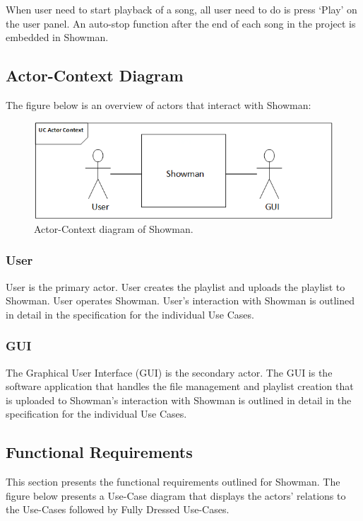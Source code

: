When user need to start playback of a song, all user need to do is press `Play' on the user panel. An auto-stop function after the end of each song in the project is embedded in Showman. \newline

\subsection{Actor-Context Diagram}

The figure below is an overview of actors that interact with Showman:

\begin{figure}[htb!]
\centering
\includegraphics[scale=1]{./pictures/ActorContext.png}
\caption{Actor-Context diagram of Showman.}
\label{fig:ActorContext.png}
\end{figure}

\subsubsection{User}
User is the primary actor. User creates the playlist and uploads the playlist to Showman. User operates Showman. User's interaction with Showman is outlined in detail in the specification for the individual Use Cases. \newline

\subsubsection{GUI}
The Graphical User Interface (GUI) is the secondary actor. The GUI is the software application that handles the file management and playlist creation that is uploaded to Showman's interaction with Showman is outlined in detail in the specification for the individual Use Cases. \newline

\subsection{Functional Requirements}
This section presents the functional requirements outlined for Showman. The figure below presents a Use-Case diagram that displays the actors' relations to the Use-Cases followed by Fully Dressed Use-Cases. \newline

